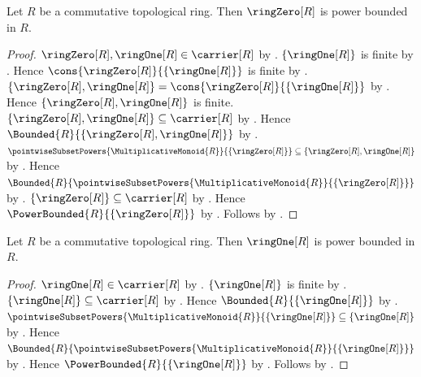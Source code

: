 \begin{theorem}\label{ring_zero_power_bounded}
    Let $R$ be a commutative topological ring.
    Then $\ringZero[R]$ is power bounded in $R$.
\end{theorem}
\begin{proof}
    $\ringZero[R],\ringOne[R]\in\carrier[R]$ by
        .
    $\{\ringOne[R]\}$ is finite by .
    Hence $\cons{\ringZero[R]}{\{\ringOne[R]\}}$ is finite by
        .
    $\{\ringZero[R],\ringOne[R]\}
        =\cons{\ringZero[R]}{\{\ringOne[R]\}}$ by
        .
    Hence $\{\ringZero[R],\ringOne[R]\}$ is finite.
    $\{\ringZero[R],\ringOne[R]\}\subseteq\carrier[R]$ by
        .
    Hence $\Bounded{R}{\{\ringZero[R],\ringOne[R]\}}$ by
        .
    $\pointwiseSubsetPowers{\MultiplicativeMonoid{R}}{
        \{\ringZero[R]\}}\subseteq\{\ringZero[R],\ringOne[R]\}$ by
        .
    Hence $\Bounded{R}{\pointwiseSubsetPowers{
        \MultiplicativeMonoid{R}}{\{\ringZero[R]\}}}$ by
        .
    $\{\ringZero[R]\}\subseteq\carrier[R]$ by
        .
    Hence $\PowerBounded{R}{\{\ringZero[R]\}}$ by
        .
    Follows by .
\end{proof}

\begin{theorem}\label{ring_one_power_bounded}
    Let $R$ be a commutative topological ring.
    Then $\ringOne[R]$ is power bounded in $R$.
\end{theorem}
\begin{proof}
    $\ringOne[R]\in\carrier[R]$ by .
    $\{\ringOne[R]\}$ is finite by .
    $\{\ringOne[R]\}\subseteq\carrier[R]$ by
        .
    Hence $\Bounded{R}{\{\ringOne[R]\}}$ by
        .
    $\pointwiseSubsetPowers{\MultiplicativeMonoid{R}}{
        \{\ringOne[R]\}}\subseteq\{\ringOne[R]\}$ by
        .
    Hence $\Bounded{R}{\pointwiseSubsetPowers{
        \MultiplicativeMonoid{R}}{\{\ringOne[R]\}}}$ by
        .
    Hence $\PowerBounded{R}{\{\ringOne[R]\}}$ by
        .
    Follows by .
\end{proof}

